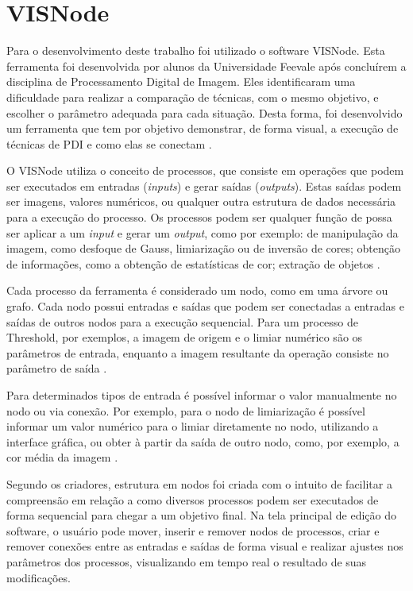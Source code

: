 \documentclass[
	12pt,				%
	oneside,			%
	a4paper,			%
	english,			%
	french,				%
	spanish,			%
	brazil,				%
	]{abntex2}
\begin{document}
\section{VISNode}

Para o desenvolvimento deste trabalho foi utilizado o software VISNode. Esta ferramenta foi desenvolvida por alunos da Universidade Feevale após concluírem a disciplina de Processamento Digital de Imagem. Eles identificaram uma dificuldade para realizar a comparação de técnicas, com o mesmo objetivo, e escolher o parâmetro adequada para cada situação. Desta forma, foi desenvolvido um ferramenta que tem por objetivo demonstrar, de forma visual,  a execução de técnicas de PDI e como elas se conectam \cite{visnode}.

O VISNode utiliza o conceito de processos, que consiste em operações que podem ser executados em entradas (\textit{inputs}) e gerar saídas (\textit{outputs}). Estas saídas podem ser imagens, valores numéricos, ou qualquer outra estrutura de dados necessária para a execução do processo. Os processos podem ser qualquer função de possa ser aplicar a um \textit{input} e gerar um \textit{output}, como por exemplo: de manipulação da imagem, como desfoque de Gauss, limiarização ou de inversão de cores; obtenção de informações, como a obtenção de estatísticas de cor;  extração de objetos \cite{visnode}.

Cada processo da ferramenta é considerado um nodo, como em uma árvore ou grafo. Cada nodo possui entradas e saídas que podem ser conectadas a entradas e saídas de outros nodos para a execução sequencial. Para um processo de Threshold, por exemplos, a imagem de origem e o limiar numérico são os parâmetros de entrada, enquanto a imagem resultante da operação consiste no parâmetro de saída \cite{visnode}. 

Para determinados tipos de entrada é possível informar o valor manualmente no nodo ou via conexão. Por exemplo, para o nodo de limiarização é possível informar um valor numérico para o limiar diretamente no nodo, utilizando a interface gráfica, ou obter à partir da saída de outro nodo, como, por exemplo, a cor média da imagem \cite{visnode}.

Segundo os criadores, estrutura em nodos foi criada com o intuito de facilitar a compreensão em relação a como diversos processos podem ser executados de forma sequencial para chegar a um objetivo final. Na tela principal de edição do software, o usuário pode mover, inserir e remover nodos de processos, criar e remover conexões entre as entradas e saídas de forma visual e realizar ajustes nos parâmetros dos processos, visualizando em tempo real o resultado de suas modificações.
\end{document}
